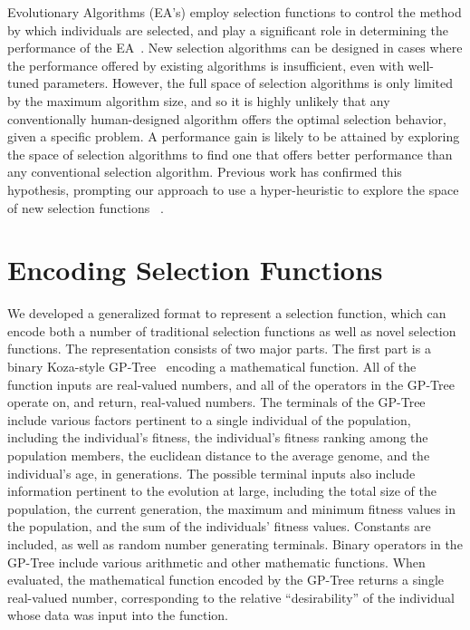 \documentclass[sigconf]{acmart}
\begin{document}
Evolutionary Algorithms (EA's) employ selection functions to control the method by which individuals are selected, and play a significant role in determining the performance of the EA~\citep{woodward2010metaBias}. New selection algorithms can be designed in cases where the performance offered by existing algorithms is insufficient, even with well-tuned parameters. However, the full space of selection algorithms is only limited by the maximum algorithm size, and so it is highly unlikely that any conventionally human-designed algorithm offers the optimal selection behavior, given a specific problem. A performance gain is likely to be attained by exploring the space of selection algorithms to find one that offers better performance than any conventional selection algorithm. Previous work has confirmed this hypothesis, prompting our approach to use a hyper-heuristic to explore the space of new selection functions ~\citep{woodward2011selection}.


\section{Encoding Selection Functions}
\label{Encoding Selection Functions}

We developed a generalized format to represent a selection function, which can encode both a number of traditional selection functions as well as novel selection functions. The representation consists of two major parts. The first part is a binary Koza-style GP-Tree~\citep{koza1994genetic} encoding a mathematical function. All of the function inputs are real-valued numbers, and all of the operators in the GP-Tree operate on, and return, real-valued numbers. The terminals of the GP-Tree include various factors pertinent to a single individual of the population, including the individual's fitness, the individual's fitness ranking among the population members, the euclidean distance to the average genome, and the individual's age, in generations. The possible terminal inputs also include information pertinent to the evolution at large, including the total size of the population, the current generation, the maximum and minimum fitness values in the population, and the sum of the individuals' fitness values. Constants are included, as well as random number generating terminals. Binary operators in the GP-Tree include various arithmetic and other mathematic functions. When evaluated, the mathematical function encoded by the GP-Tree returns a single real-valued number, corresponding to the relative ``desirability'' of the individual whose data was input into the function.
\end{document}
